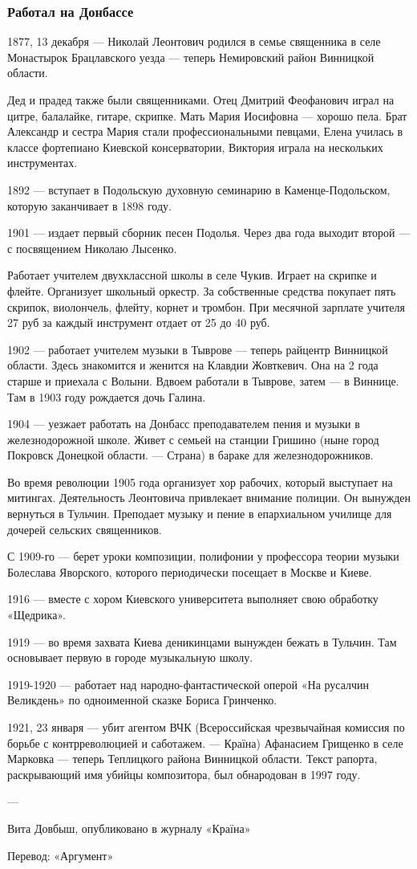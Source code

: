 \subsubsection{Работал на Донбассе}

1877, 13 декабря — Николай Леонтович родился в семье священника в селе
Монастырок Брацлавского уезда — теперь Немировский район Винницкой области.

Дед и прадед также были священниками. Отец Дмитрий Феофанович играл на цитре,
балалайке, гитаре, скрипке. Мать Мария Иосифовна — хорошо пела. Брат Александр
и сестра Мария стали профессиональными певцами, Елена училась в классе
фортепиано Киевской консерватории, Виктория играла на нескольких инструментах.

1892 — вступает в Подольскую духовную семинарию в Каменце-Подольском, которую
заканчивает в 1898 году.

1901 — издает первый сборник песен Подолья. Через два года выходит второй — с
посвящением Николаю Лысенко.

Работает учителем двухклассной школы в селе Чукив. Играет на скрипке и флейте.
Организует школьный оркестр. За собственные средства покупает пять скрипок,
виолончель, флейту, корнет и тромбон. При месячной зарплате учителя 27 руб за
каждый инструмент отдает от 25 до 40 руб.

1902 — работает учителем музыки в Тыврове — теперь райцентр Винницкой области.
Здесь знакомится и женится на Клавдии Жовткевич. Она на 2 года старше и
приехала с Волыни. Вдвоем работали в Тыврове, затем — в Виннице. Там в 1903
году рождается дочь Галина.

1904 — уезжает работать на Донбасс преподавателем пения и музыки в
железнодорожной школе. Живет с семьей на станции Гришино (ныне город Покровск
Донецкой области. — Страна) в бараке для железнодорожников.

Во время революции 1905 года организует хор рабочих, который выступает на
митингах. Деятельность Леонтовича привлекает внимание полиции. Он вынужден
вернуться в Тульчин. Преподает музыку и пение в епархиальном училище для
дочерей сельских священников.

С 1909-го — берет уроки композиции, полифонии у профессора теории музыки
Болеслава Яворского, которого периодически посещает в Москве и Киеве.

1916 — вместе с хором Киевского университета выполняет свою обработку
«Щедрика».

1919 — во время захвата Киева деникинцами вынужден бежать в Тульчин. Там
основывает первую в городе музыкальную школу.

1919-1920 — работает над народно-фантастической оперой «На русалчин Великдень»
по одноименной сказке Бориса Гринченко.

1921, 23 января — убит агентом ВЧК (Всероссийская чрезвычайная комиссия по
борьбе с контрреволюцией и саботажем. — Країна) Афанасием Грищенко в селе
Марковка — теперь Теплицкого района Винницкой области. Текст рапорта,
раскрывающий имя убийцы композитора, был обнародован в 1997 году.

—

Вита Довбыш, опубликовано в журналу «Країна»

Перевод: «Аргумент»
